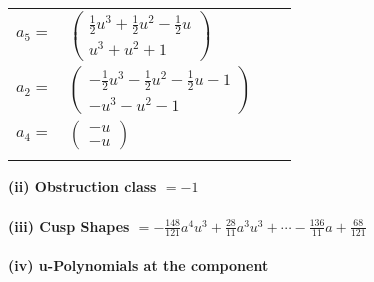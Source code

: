 \documentclass[1p]{elsarticle_modified}
\theoremstyle{definition}
\begin{document}
\begin{tabular}{m{7pt} m{180pt} m{7pt} m{180pt} }
\flushright $a_{5}=$&$\begin{pmatrix}\frac{1}{2} u^3+\frac{1}{2} u^2-\frac{1}{2} u\\u^3+u^2+1\end{pmatrix}$ \\
\flushright $a_{2}=$&$\begin{pmatrix}-\frac{1}{2} u^3-\frac{1}{2} u^2-\frac{1}{2} u-1\\- u^3- u^2-1\end{pmatrix}$ \\
\flushright $a_{4}=$&$\begin{pmatrix}- u\\- u\end{pmatrix}$\\&\end{tabular}
\flushleft \textbf{(ii) Obstruction class $= -1$}\\~\\
\flushleft \textbf{(iii) Cusp Shapes $= -\frac{148}{121} a^4 u^3+\frac{28}{11} a^3 u^3+\cdots-\frac{136}{11} a+\frac{68}{121}$}\\~\\
\newpage\renewcommand{\arraystretch}{1}
\flushleft \textbf{(iv) u-Polynomials at the component}\newline \\
\end{document}
